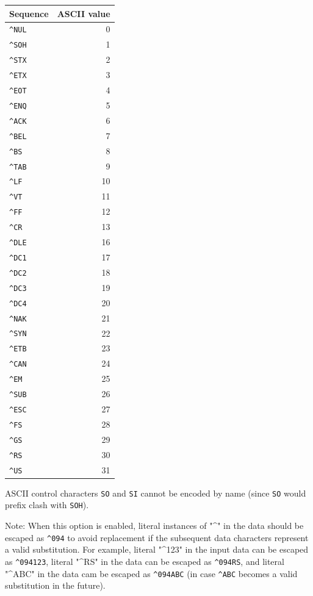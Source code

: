 \begin{longtable}[]{@{}lr@{}}
\toprule()
Sequence & ASCII value \\
\midrule()
\endhead
\texttt{\^{}NUL} & 0 \\
\texttt{\^{}SOH} & 1 \\
\texttt{\^{}STX} & 2 \\
\texttt{\^{}ETX} & 3 \\
\texttt{\^{}EOT} & 4 \\
\texttt{\^{}ENQ} & 5 \\
\texttt{\^{}ACK} & 6 \\
\texttt{\^{}BEL} & 7 \\
\texttt{\^{}BS} & 8 \\
\texttt{\^{}TAB} & 9 \\
\texttt{\^{}LF} & 10 \\
\texttt{\^{}VT} & 11 \\
\texttt{\^{}FF} & 12 \\
\texttt{\^{}CR} & 13 \\
\texttt{\^{}DLE} & 16 \\
\texttt{\^{}DC1} & 17 \\
\texttt{\^{}DC2} & 18 \\
\texttt{\^{}DC3} & 19 \\
\texttt{\^{}DC4} & 20 \\
\texttt{\^{}NAK} & 21 \\
\texttt{\^{}SYN} & 22 \\
\texttt{\^{}ETB} & 23 \\
\texttt{\^{}CAN} & 24 \\
\texttt{\^{}EM} & 25 \\
\texttt{\^{}SUB} & 26 \\
\texttt{\^{}ESC} & 27 \\
\texttt{\^{}FS} & 28 \\
\texttt{\^{}GS} & 29 \\
\texttt{\^{}RS} & 30 \\
\texttt{\^{}US} & 31 \\
\bottomrule()
\end{longtable}

ASCII control characters \texttt{SO} and \texttt{SI} cannot be encoded
by name (since \texttt{SO} would prefix clash with \texttt{SOH}).

Note: When this option is enabled, literal instances of "\^{}" in the
data should be escaped as \texttt{\^{}094} to avoid replacement if the
subsequent data characters represent a valid substitution. For example,
literal "\^{}123" in the input data can be escaped as
\texttt{\^{}094123}, literal "\^{}RS" in the data can be escaped as
\texttt{\^{}094RS}, and literal "\^{}ABC" in the data cam be escaped as
\texttt{\^{}094ABC} (in case \texttt{\^{}ABC} becomes a valid
substitution in the future).

